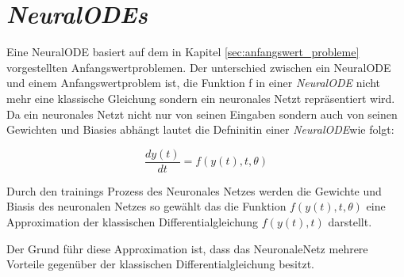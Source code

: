 
\section{\textit{NeuralODEs}} \label{sec:neural_ode}

Eine NeuralODE \cite{neuralode} basiert auf dem in Kapitel \ref{sec:anfangswert_probleme} vorgestellten Anfangswertproblemen.
Der unterschied zwischen ein NeuralODE und einem Anfangswertproblem ist, 
die Funktion f in einer \textit{NeuralODE} nicht mehr eine klassische Gleichung sondern ein 
neuronales Netzt repräsentiert wird.
Da ein neuronales Netzt nicht nur von seinen Eingaben sondern auch von seinen Gewichten und Biasies abhängt
lautet die Defninitin einer \textit{NeuralODE}wie folgt:

$$
\frac{d y(t)}{dt} = f(y(t), t, \theta)
$$

Durch den trainings Prozess des Neuronales Netzes werden die Gewichte und Biasis des neuronalen Netzes 
so gewählt das die Funktion $f(y(t), t, \theta)$ eine Approximation der klassischen Differentialgleichung 
$f(y(t), t)$ darstellt.

Der Grund führ diese Approximation ist, dass das NeuronaleNetz mehrere Vorteile gegenüber der klassischen Differentialgleichung besitzt.









